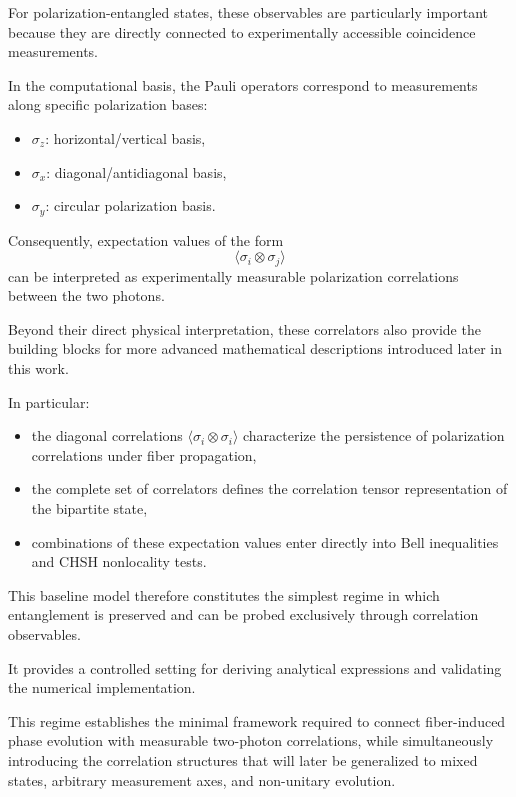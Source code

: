 \medskip

For polarization-entangled states, these observables are particularly important because they are directly connected to experimentally accessible coincidence measurements.

In the computational basis, the Pauli operators correspond to measurements along specific polarization bases:
\begin{itemize}
\item \( \sigma_z \): horizontal/vertical basis,
\item \( \sigma_x \): diagonal/antidiagonal basis,
\item \( \sigma_y \): circular polarization basis.
\end{itemize}

Consequently, expectation values of the form
\[
\langle \sigma_i \otimes \sigma_j \rangle
\]
can be interpreted as experimentally measurable polarization correlations between the two photons.

\medskip

Beyond their direct physical interpretation, these correlators also provide the building blocks for more advanced mathematical descriptions introduced later in this work.

In particular:
\begin{itemize}
\item the diagonal correlations \( \langle \sigma_i \otimes \sigma_i \rangle \) characterize the persistence of polarization correlations under fiber propagation,
\item the complete set of correlators defines the correlation tensor representation of the bipartite state,
\item combinations of these expectation values enter directly into Bell inequalities and CHSH nonlocality tests.
\end{itemize}

\medskip

This baseline model therefore constitutes the simplest regime in which entanglement is preserved and can be probed exclusively through correlation observables.

It provides a controlled setting for deriving analytical expressions and validating the numerical implementation.

\medskip

This regime establishes the minimal framework required to connect fiber-induced phase evolution with measurable two-photon correlations, while simultaneously introducing the correlation structures that will later be generalized to mixed states, arbitrary measurement axes, and non-unitary evolution.

